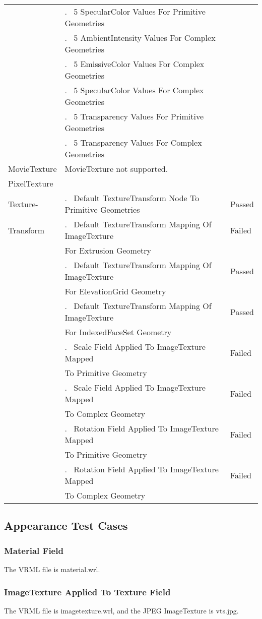 \documentclass[12pt,letterpaper]{article}
\newcounter{testCaseCtr}
\newcommand{\testCase}{\arabic{testCaseCtr}.~ \stepcounter{testCaseCtr}}
\newcommand{\resetTestCase}{\setcounter{testCaseCtr}{1}}
\newcommand{\AppA}{Material Field}
\newcommand{\AppB}{ImageTexture Applied To Texture Field}
\newcommand{\MatX}{5 SpecularColor Values For Primitive Geometries}
\newcommand{\MatY}{5 AmbientIntensity Values For Complex Geometries}
\newcommand{\MatZ}{5 EmissiveColor Values For Complex Geometries}
\newcommand{\MatAA}{5 SpecularColor Values For Complex Geometries}
\newcommand{\MatAB}{5 Transparency Values For Primitive Geometries}
\newcommand{\MatAC}{5 Transparency Values For Complex Geometries}
\newcommand{\TTA}{Default TextureTransform Node To Primitive Geometries}
\newcommand{\TTBa}{Default TextureTransform Mapping Of ImageTexture}
\newcommand{\TTBb}{For Extrusion Geometry}
\newcommand{\TTCa}{Default TextureTransform Mapping Of ImageTexture}
\newcommand{\TTCb}{For ElevationGrid Geometry}
\newcommand{\TTDa}{Default TextureTransform Mapping Of ImageTexture}
\newcommand{\TTDb}{For IndexedFaceSet Geometry}
\newcommand{\TTEa}{Scale Field Applied To ImageTexture Mapped}
\newcommand{\TTEb}{To Primitive Geometry}
\newcommand{\TTFa}{Scale Field Applied To ImageTexture Mapped}
\newcommand{\TTFb}{To Complex Geometry}
\newcommand{\TTGa}{Rotation Field Applied To ImageTexture Mapped}
\newcommand{\TTGb}{To Primitive Geometry}
\newcommand{\TTHa}{Rotation Field Applied To ImageTexture Mapped}
\newcommand{\TTHb}{To Complex Geometry}
\begin{document}
\begin{center}
\begin{longtable}{|l|l|l|}
 & \testCase \MatX & \\\cline{2-3}
 & \testCase \MatY & \\\cline{2-3}
 & \testCase \MatZ & \\\cline{2-3}
 & \testCase \MatAA & \\\cline{2-3}
 & \testCase \MatAB & \\\cline{2-3}
 & \testCase \MatAC & \\\hline
\resetTestCase
MovieTexture & MovieTexture not supported. & \\\hline
\resetTestCase
PixelTexture & & \\\hline
\resetTestCase
Texture- & \testCase \TTA & Passed \\\cline{2-3}
Transform & \testCase \TTBa & Failed \\
 & \TTBb & \\\cline{2-3}
 & \testCase \TTCa & Passed \\
 & \TTCb & \\\cline{2-3}
 & \testCase \TTDa & Passed \\
 & \TTDb & \\\cline{2-3}
 & \testCase \TTEa & Failed \\
 & \TTEb & \\\cline{2-3}
 & \testCase \TTFa & Failed \\
 & \TTFb & \\\cline{2-3}
 & \testCase \TTGa & Failed \\
 & \TTGb & \\\cline{2-3}
 & \testCase \TTHa & Failed \\
 & \TTHb & \\\cline{2-3}
\end{longtable}
\end{center}

\subsection{Appearance Test Cases}

\subsubsection{\AppA}
The VRML file is material.wrl.

\subsubsection{\AppB}
\label{sec:imagetexture}
The VRML file is imagetexture.wrl, and the JPEG ImageTexture is vts.jpg.
\end{document}
